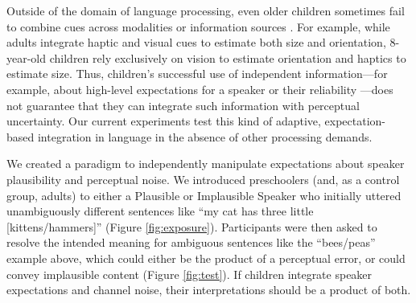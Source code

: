 \documentclass[man,floatsintext]{apa6}
\begin{document}
Outside of the domain of language processing, even older children sometimes fail to combine cues across modalities or information sources \cite{gori2008,nardini2008,nardini2010}. For example, while adults integrate haptic and visual cues to estimate both size and orientation, 8-year-old children rely exclusively on vision to estimate orientation and haptics to estimate size. Thus, children's successful use of independent information---for example, about high-level expectations for a speaker \cite{graham2014,matthews2010} or their reliability \cite{pasquini2007}---does not guarantee that they can integrate such information with perceptual uncertainty. Our current experiments test this kind of adaptive, expectation-based integration in language in the absence of other processing demands.


We created a paradigm to independently manipulate expectations about speaker plausibility and perceptual noise. We introduced preschoolers (and, as a control group, adults) to either a Plausible or Implausible Speaker who initially uttered unambiguously different sentences like ``my cat has three little [kittens/hammers]'' (Figure \ref{fig:exposure}). Participants were then asked to resolve the intended meaning for ambiguous sentences like the ``bees/peas'' example above, which could either be the product of a perceptual error, or could convey implausible content (Figure \ref{fig:test}). If children integrate speaker expectations and channel noise, their interpretations should be a product of both.

\end{document}
